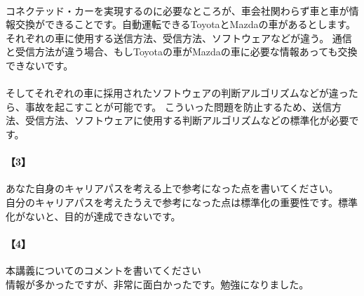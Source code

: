 \documentclass[20 pts]{article}
\begin{document}
\paragraph{}
コネクテッド・カーを実現するのに必要なところが、車会社関わらず車と車が情報交換ができることです。自動運転できるToyotaとMazdaの車があるとします。
それぞれの車に使用する送信方法、受信方法、ソフトウェアなどが違う。
通信と受信方法が違う場合、もしToyotaの車がMazdaの車に必要な情報あっても交換できないです。
\paragraph{}そしてそれぞれの車に採用されたソフトウェアの判断アルゴリズムなどが違ったら、事故を起こすことが可能です。
こういった問題を防止するため、送信方法、受信方法、ソフトウェアに使用する判断アルゴリズムなどの標準化が必要です。


\newpage
\paragraph{【3】}あなた自身のキャリアパスを考える上で参考になった点を書いてください。\\
自分のキャリアパスを考えたうえで参考になった点は標準化の重要性です。標準化がないと、目的が達成できないです。
\paragraph{【4】}本講義についてのコメントを書いてください\\
情報が多かったですが、非常に面白かったです。勉強になりました。
\end{document}

